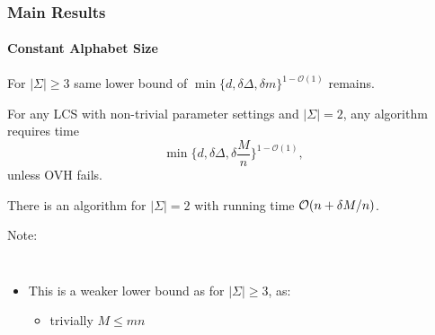 \begin{frame}
\frametitle{Main Results}
\framesubtitle{Constant Alphabet Size}

\begin{theorem}
For $|\Sigma| \geq 3$ same lower bound of $\min\{d, \delta \Delta, \delta m\}^{1 - \mathcal{O}(1)}$ remains.
\end{theorem}

\pause

\begin{theorem}
For any LCS with non-trivial parameter settings and $|\Sigma| = 2$, any algorithm requires time 
\[
\min\{d, \delta \Delta, \delta\frac{M}{n}\}^{1 - \mathcal{O}(1)},
\] 
unless OVH fails.

There is an algorithm for $|\Sigma| = 2$ with running time $\mathcal{O}(n + \delta M / n)$.
\end{theorem}

\pause

\begin{exampleblock}{Note:}
\vspace{-1ex}
\begin{columns}
	\begin{itemize}
		\item This is a weaker lower bound as for $|\Sigma| \geq 3$, as:
		\begin{itemize}
			\item<4-> trivially $M \leq mn$ \visible<5->{$\Rightarrow \frac{M}{n} \leq m \Rightarrow \delta \frac{M}{n} \leq \delta m$}
		\end{itemize}
	\end{itemize}
\end{columns}
\end{exampleblock}

\end{frame}







\begin{frame}

\end{frame}
